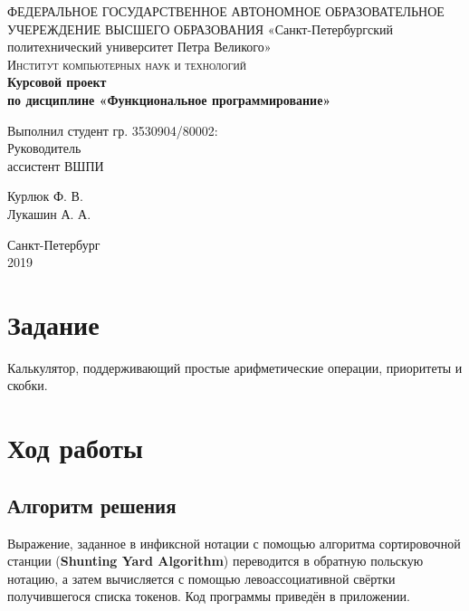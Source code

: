 \documentclass[a4paper,11pt]{article}
\begin{document}
\lstset{style=mycode}

\begin{titlepage}
  \center
  ФЕДЕРАЛЬНОЕ ГОСУДАРСТВЕННОЕ АВТОНОМНОЕ ОБРАЗОВАТЕЛЬНОЕ УЧЕРЕЖДЕНИЕ ВЫСШЕГО ОБРАЗОВАНИЯ\linebreak  
  «Санкт-Петербургский политехнический университет Петра Великого»\\[2cm] 
  \textsc{\Large Институт компьютерных наук и технологий}\\[6.5cm]
  
  { 
    \huge \bfseries Курсовой проект\\
    по дисциплине «Функциональное программирование»
  } \\[6.5cm]

  \begin{multicols}{2}
  \begin{flushright}
    \large
    
    {Выполнил студент гр. 3530904/80002:}\\[0.5cm]
    
    {Руководитель\\
    ассистент ВШПИ}

  \end{flushright}
  \begin{flushright}
    
    {Курлюк Ф. В.}\\[0.5cm]   
     
    Лукашин А. А.
    
  \end{flushright}
  \end{multicols}
  
  \bigskip
  \centering
  {
    Санкт-Петербург\\
    2019
  }
  \vfill
\end{titlepage}

\section{Задание}
  Калькулятор, поддерживающий простые арифметические операции, приоритеты и скобки.

\section{Ход работы}
  \subsection{Алгоритм решения}
  Выражение, заданное в инфиксной нотации с помощью алгоритма сортировочной станции (\textbf{Shunting Yard Algorithm}) переводится в
  обратную польскую нотацию, а затем вычисляется с помощью левоассоциативной свёртки получившегося списка токенов.
  Код программы приведён в приложении.
\end{document}
